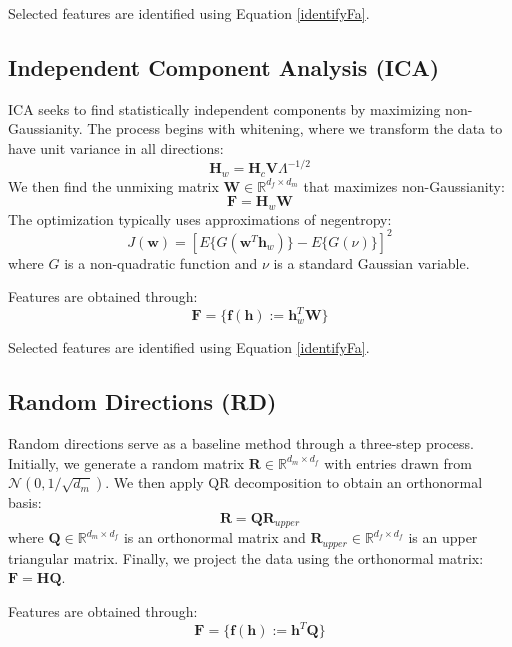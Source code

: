 Selected features are identified using Equation \ref{identifyFa}.
\subsection{Independent Component Analysis (ICA)}
ICA seeks to find statistically independent components by maximizing non-Gaussianity. The process begins with whitening, where we transform the data to have unit variance in all directions:
\begin{equation}
    \mathbf{H}_w = \mathbf{H}_c\mathbf{V}\Lambda^{-1/2}
\end{equation}
We then find the unmixing matrix $\mathbf{W} \in \mathbb{R}^{d_f \times d_m}$ that maximizes non-Gaussianity:
\begin{equation}
    \mathbf{F} = \mathbf{H}_w\mathbf{W}
\end{equation}
The optimization typically uses approximations of negentropy:
\begin{equation}
    J(\mathbf{w}) = [E\{G(\mathbf{w}^T\mathbf{h}_w)\} - E\{G(\nu)\}]^2
\end{equation}
where $G$ is a non-quadratic function and $\nu$ is a standard Gaussian variable.

Features are obtained through:
\begin{equation}
    \mathbf{F} = \{\mathbf{f}(\mathbf{h}) := \mathbf{h}_w^T\mathbf{W}\}
\end{equation}


Selected features are identified using Equation \ref{identifyFa}.

\subsection{Random Directions (RD)}
Random directions serve as a baseline method through a three-step process. Initially, we generate a random matrix $\mathbf{R} \in \mathbb{R}^{d_m \times d_f}$ with entries drawn from $\mathcal{N}(0, 1/\sqrt{d_m})$. We then apply QR decomposition to obtain an orthonormal basis:
\begin{equation}
    \mathbf{R} = \mathbf{Q}\mathbf{R}_{upper}
\end{equation}
where $\mathbf{Q} \in \mathbb{R}^{d_m \times d_f}$ is an orthonormal matrix and $\mathbf{R}_{upper} \in \mathbb{R}^{d_f \times d_f}$ is an upper triangular matrix. Finally, we project the data using the orthonormal matrix: $\mathbf{F} = \mathbf{H}\mathbf{Q}$.

Features are obtained through:
\begin{equation}
    \mathbf{F} = \{\mathbf{f}(\mathbf{h}) := \mathbf{h}^T\mathbf{Q}\}
\end{equation}


